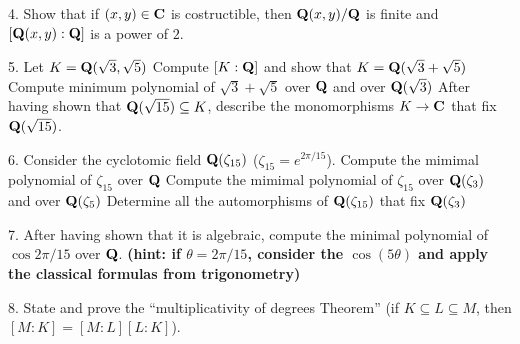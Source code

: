 
\item{4.} Show that if $(x,y)\in{\bf C}$ is costructible, then ${\bf Q}(x,y)/{\bf Q}$ is finite and $[{\bf Q}(x,y):{\bf Q}]$ is a power of $2$.\ve\ \vs

\item{5.} Let $K={\bf Q}(\sqrt3,\sqrt5)$
 Compute $[K:{\bf Q}]$ and show that $K={\bf Q}(\sqrt3+\sqrt5)$
 Compute minimum polynomial of $\sqrt3+\sqrt5$ over ${\bf Q}$ and over
${\bf Q}(\sqrt3)$
 After having shown that ${\bf Q}(\sqrt{15})\subseteq K$, describe the monomorphisms $K\rightarrow {\bf C}$ that fix ${\bf Q}(\sqrt{15})$. 
\vv


\item{6.} Consider the cyclotomic field ${\bf Q}(\zeta_{15})$ ($\zeta_{15}=e^{2\pi/15}$).
 Compute the mimimal polynomial of $\zeta_{15}$ over ${\bf Q}$
 Compute the mimimal polynomial of $\zeta_{15}$ over ${\bf Q}(\zeta_3)$ and over ${\bf Q}(\zeta_5)$
 Determine all the automorphisms of ${\bf Q}(\zeta_{15})$ that fix ${\bf Q}(\zeta_3)$\ve\ \vs

\item{7.} After having shown that it is algebraic, compute the minimal polynomial of $\cos2\pi/15$ over ${\bf Q}$. \bf(hint: if $\theta=2\pi/15$, consider the $\cos(5\theta)$ and apply the classical formulas from trigonometry)\rm 
\vv

\item{8.} State and prove the ``multiplicativity of degrees Theorem'' (if $K\subseteq L\subseteq M$, then $[M:K]=[M:L][L:K]$).
\ve

 \bye
